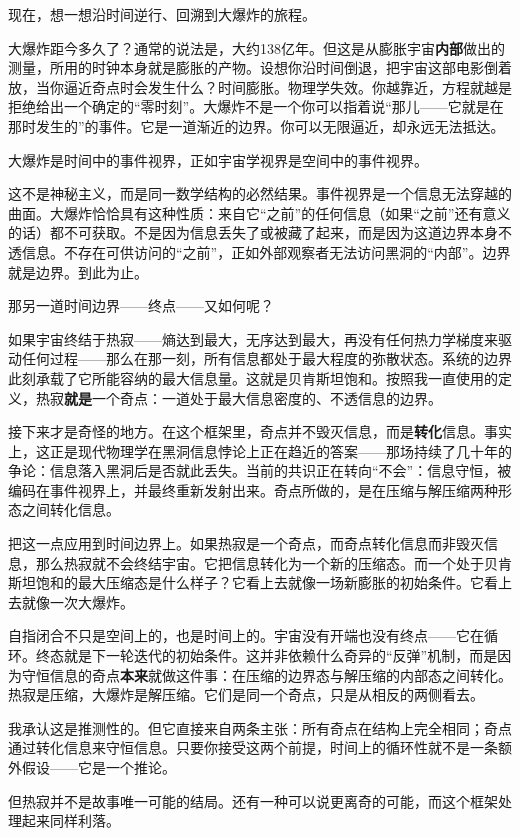 \documentclass[11pt, twoside, openright]{book}
\begin{document}
现在，想一想沿时间逆行、回溯到大爆炸的旅程。

大爆炸距今多久了？通常的说法是，大约138亿年。但这是从膨胀宇宙\textbf{内部}做出的测量，所用的时钟本身就是膨胀的产物。设想你沿时间倒退，把宇宙这部电影倒着放，当你逼近奇点时会发生什么？时间膨胀。物理学失效。你越靠近，方程就越是拒绝给出一个确定的“零时刻”。大爆炸不是一个你可以指着说“那儿------它就是在那时发生的”的事件。它是一道渐近的边界。你可以无限逼近，却永远无法抵达。

大爆炸是时间中的事件视界，正如宇宙学视界是空间中的事件视界。

这不是神秘主义，而是同一数学结构的必然结果。事件视界是一个信息无法穿越的曲面。大爆炸恰恰具有这种性质：来自它“之前”的任何信息（如果“之前”还有意义的话）都不可获取。不是因为信息丢失了或被藏了起来，而是因为这道边界本身不透信息。不存在可供访问的“之前”，正如外部观察者无法访问黑洞的“内部”。边界就是边界。到此为止。

那另一道时间边界------终点------又如何呢？

如果宇宙终结于热寂------熵达到最大，无序达到最大，再没有任何热力学梯度来驱动任何过程------那么在那一刻，所有信息都处于最大程度的弥散状态。系统的边界此刻承载了它所能容纳的最大信息量。这就是贝肯斯坦饱和。按照我一直使用的定义，热寂\textbf{就是}一个奇点：一道处于最大信息密度的、不透信息的边界。

接下来才是奇怪的地方。在这个框架里，奇点并不毁灭信息，而是\textbf{转化}信息。事实上，这正是现代物理学在黑洞信息悖论上正在趋近的答案------那场持续了几十年的争论：信息落入黑洞后是否就此丢失。当前的共识正在转向“不会”：信息守恒，被编码在事件视界上，并最终重新发射出来。奇点所做的，是在压缩与解压缩两种形态之间转化信息。

把这一点应用到时间边界上。如果热寂是一个奇点，而奇点转化信息而非毁灭信息，那么热寂就不会终结宇宙。它把信息转化为一个新的压缩态。而一个处于贝肯斯坦饱和的最大压缩态是什么样子？它看上去就像一场新膨胀的初始条件。它看上去就像一次大爆炸。

自指闭合不只是空间上的，也是时间上的。宇宙没有开端也没有终点------它在循环。终态就是下一轮迭代的初始条件。这并非依赖什么奇异的“反弹”机制，而是因为守恒信息的奇点\textbf{本来}就做这件事：在压缩的边界态与解压缩的内部态之间转化。热寂是压缩，大爆炸是解压缩。它们是同一个奇点，只是从相反的两侧看去。

我承认这是推测性的。但它直接来自两条主张：所有奇点在结构上完全相同；奇点通过转化信息来守恒信息。只要你接受这两个前提，时间上的循环性就不是一条额外假设------它是一个推论。

但热寂并不是故事唯一可能的结局。还有一种可以说更离奇的可能，而这个框架处理起来同样利落。
\end{document}
